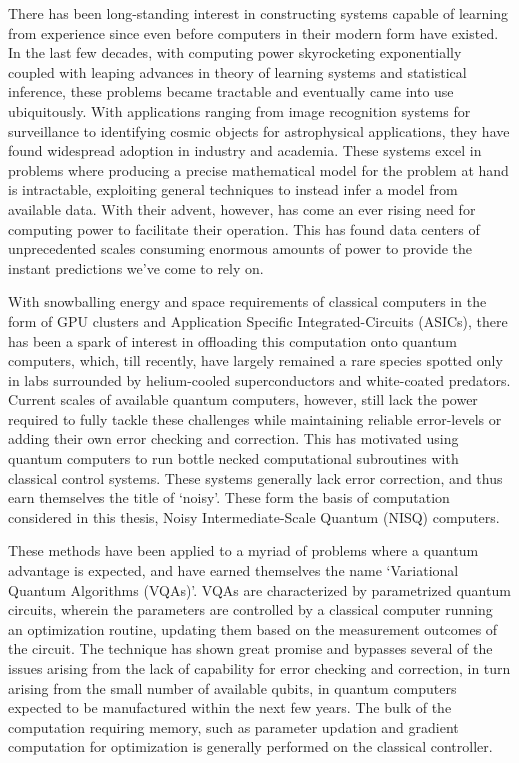 
There has been long-standing interest in constructing systems capable of
learning from experience since even before computers in their modern form have
existed. In the last few decades, with computing power skyrocketing
exponentially coupled with leaping advances in theory of learning systems and
statistical inference, these problems became tractable and eventually came into
use ubiquitously. With applications ranging from image recognition systems for
surveillance to identifying cosmic objects for astrophysical applications, they
have found widespread adoption in industry and academia. These systems excel in
problems where producing a precise mathematical model for the problem at hand is
intractable, exploiting general techniques to instead infer a model from
available data. With their advent, however, has come an ever rising need for
computing power to facilitate their operation. This has found data centers of
unprecedented scales consuming enormous amounts of power to provide the instant
predictions we've come to rely on.

With snowballing energy and space requirements of classical computers in the
form of GPU clusters and Application Specific Integrated-Circuits (ASICs), there
has been a spark of interest in offloading this computation onto quantum
computers, which, till recently, have largely remained a rare species spotted
only in labs surrounded by helium-cooled superconductors and white-coated
predators. Current scales of available quantum computers, however, still lack
the power required to fully tackle these challenges while maintaining reliable
error-levels or adding their own error checking and correction. This has
motivated using quantum computers to run bottle necked computational subroutines
with classical control systems. These systems generally lack error correction,
and thus earn themselves the title of `noisy'. These form the basis of
computation considered in this thesis, Noisy Intermediate-Scale Quantum (NISQ)
computers.

These methods have been applied to a myriad of problems where a quantum
advantage is expected, and have earned themselves the name `Variational Quantum
Algorithms (VQAs)'. VQAs are characterized by parametrized quantum circuits,
wherein the parameters are controlled by a classical computer running an
optimization routine, updating them based on the measurement outcomes of the
circuit. The technique has shown great promise and bypasses several of the
issues arising from the lack of capability for error checking and correction, in
turn arising from the small number of available qubits, in quantum computers
expected to be manufactured within the next few years. The bulk of the
computation requiring memory, such as parameter updation and gradient
computation for optimization is generally performed on the classical controller.

